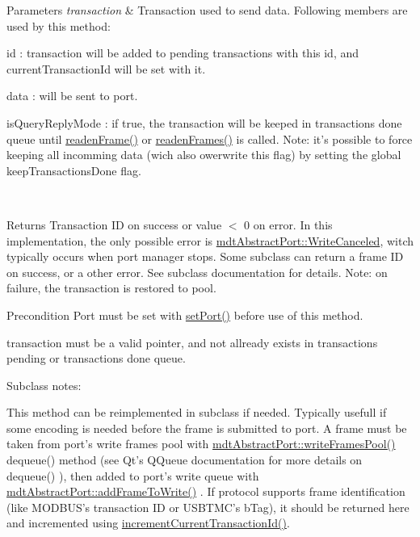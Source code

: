 \begin{DoxyParams}{Parameters}
{\em transaction} & Transaction used to send data. Following members are used by this method\-:
\begin{DoxyItemize}
\item id \-: transaction will be added to pending transactions with this id, and current\-Transaction\-Id will be set with it.
\item data \-: will be sent to port.
\item is\-Query\-Reply\-Mode \-: if true, the transaction will be keeped in transactions done queue until \hyperlink{classmdt_port_manager_a830ae182d06dd6a52c43a7f45b9240ac}{readen\-Frame()} or \hyperlink{classmdt_port_manager_addd5dcae9644cea42a9871205af41796}{readen\-Frames()} is called. Note\-: it's possible to force keeping all incomming data (wich also owerwrite this flag) by setting the global keep\-Transactions\-Done flag.
\end{DoxyItemize}\\
\hline
\end{DoxyParams}
\begin{DoxyReturn}{Returns}
Transaction I\-D on success or value $<$ 0 on error. In this implementation, the only possible error is \hyperlink{classmdt_abstract_port_ad4121bb930c95887e77f8bafa065a85eae50ff4a9393507ad39005ddc7d5be42f}{mdt\-Abstract\-Port\-::\-Write\-Canceled}, witch typically occurs when port manager stops. Some subclass can return a frame I\-D on success, or a other error. See subclass documentation for details. Note\-: on failure, the transaction is restored to pool. 
\end{DoxyReturn}
\begin{DoxyPrecond}{Precondition}
Port must be set with \hyperlink{classmdt_port_manager_afcd156b2d0c9d340999935efb6cd8cb6}{set\-Port()} before use of this method. 

transaction must be a valid pointer, and not allready exists in transactions pending or transactions done queue.
\end{DoxyPrecond}
Subclass notes\-:\par
 This method can be reimplemented in subclass if needed. Typically usefull if some encoding is needed before the frame is submitted to port. A frame must be taken from port's write frames pool with \hyperlink{classmdt_abstract_port_abf093b67fddebffa4f3c52277b9a8cf7}{mdt\-Abstract\-Port\-::write\-Frames\-Pool()} dequeue() method (see Qt's Q\-Queue documentation for more details on dequeue() ), then added to port's write queue with \hyperlink{classmdt_abstract_port_a9a69eb2fc07d551ab37c011487fa319d}{mdt\-Abstract\-Port\-::add\-Frame\-To\-Write()} . If protocol supports frame identification (like M\-O\-D\-B\-U\-S's transaction I\-D or U\-S\-B\-T\-M\-C's b\-Tag), it should be returned here and incremented using \hyperlink{classmdt_port_manager_a4d009936a0a5130f3bfecb69fee4ce42}{increment\-Current\-Transaction\-Id()}. 

